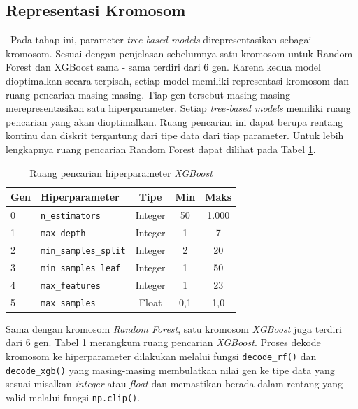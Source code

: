     \subsection{Representasi Kromosom}\label{sec:method construction}\
    Pada tahap ini, parameter \textit{tree-based models} direpresentasikan sebagai kromosom. Sesuai dengan penjelasan sebelumnya satu kromosom untuk Random Forest dan XGBoost sama - sama terdiri dari 6 gen. Karena kedua model dioptimalkan secara terpisah, setiap model memiliki representasi kromosom dan ruang pencarian masing-masing. Tiap gen tersebut masing-masing merepresentasikan satu hiperparameter. Setiap \textit{tree-based models} memiliki ruang pencarian yang akan dioptimalkan. Ruang pencarian ini dapat berupa rentang kontinu dan diskrit tergantung dari tipe data dari tiap parameter. Untuk lebih lengkapnya ruang pencarian Random Forest dapat dilihat pada Tabel \ref{tab:search_space_rf}.

    \begin{table}[H]
    \centering
    \caption{Ruang pencarian hiperparameter \textit{XGBoost}}
    \label{tab:search_space_rf}
    \begin{tabular}{llccc}
    \toprule
    \textbf{Gen} & \textbf{Hiperparameter} & \textbf{Tipe} & \textbf{Min} & \textbf{Maks} \\
    \midrule
    0 & \texttt{n\_estimators}       & Integer & 50    & 1.000 \\
    1 & \texttt{max\_depth}          & Integer & 1     & 7     \\
    2 & \texttt{min\_samples\_split} & Integer & 2     & 20    \\
    3 & \texttt{min\_samples\_leaf}  & Integer & 1     & 50    \\
    4 & \texttt{max\_features}       & Integer & 1     & 23 \\
    5 & \texttt{max\_samples}        & Float   & 0{,}1 & 1{,}0 \\
    \bottomrule
    \end{tabular}
    \end{table}
    
    Sama dengan kromosom \textit{Random Forest}, satu kromosom \textit{XGBoost} juga terdiri dari 6 gen. Tabel \ref{tab:search_space_rf} merangkum ruang pencarian \textit{XGBoost}. Proses dekode kromosom ke hiperparameter dilakukan melalui fungsi \texttt{decode\_rf()} dan \texttt{decode\_xgb()} yang masing-masing membulatkan nilai gen ke tipe data yang sesuai misalkan \textit{integer} atau \textit{float} dan memastikan berada dalam rentang yang valid melalui fungsi \texttt{np.clip()}.
    
